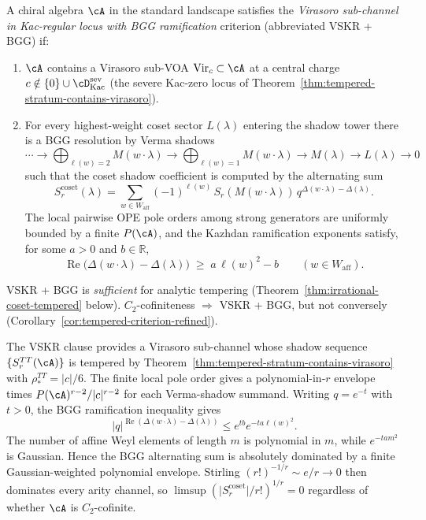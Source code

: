 \begin{definition}
\label{def:vskr-bgg-criterion}
A chiral algebra $\cA$ in the standard landscape satisfies the
\emph{Virasoro sub-channel in Kac-regular locus with BGG
ramification} criterion (abbreviated
VSKR + BGG) if:
\begin{enumerate}[nosep]
\item[(VSKR)] $\cA$ contains a Virasoro sub-VOA
 $\mathrm{Vir}_c \subset \cA$ at a central charge
 $c \notin \{0\} \cup \cD^{\mathrm{sev}}_{\mathrm{Kac}}$ (the
 severe Kac-zero locus of
 Theorem~\ref{thm:tempered-stratum-contains-virasoro}).
\item[(BGG)] For every highest-weight coset sector $L(\lambda)$
 entering the shadow tower there is a BGG resolution by Verma shadows
\[
 \cdots \longrightarrow
 \bigoplus_{\ell(w)=2} M(w\!\cdot\!\lambda)
 \longrightarrow
 \bigoplus_{\ell(w)=1} M(w\!\cdot\!\lambda)
 \longrightarrow
 M(\lambda)
 \longrightarrow
 L(\lambda)
 \longrightarrow 0
\]
 such that the coset shadow coefficient is computed by the
 alternating sum
\[
 S_r^{\mathrm{coset}}(\lambda)
 =
 \sum_{w\in W_{\mathrm{aff}}}
 (-1)^{\ell(w)}\,
 S_r(M(w\!\cdot\!\lambda))\,
 q^{\Delta(w\!\cdot\!\lambda)-\Delta(\lambda)}.
\]
 The local pairwise OPE pole orders among strong generators are
 uniformly bounded by a finite $P(\cA)$, and the Kazhdan ramification
 exponents satisfy, for some $a>0$ and $b\in\mathbb R$,
\[
 \operatorname{Re}\bigl(\Delta(w\!\cdot\!\lambda)-\Delta(\lambda)\bigr)
 \;\ge\;
 a\,\ell(w)^2-b
 \qquad (w\in W_{\mathrm{aff}}).
\]
\end{enumerate}
VSKR + BGG is \emph{sufficient} for analytic tempering
(Theorem~\ref{thm:irrational-coset-tempered} below).
$C_2$-cofiniteness $\Longrightarrow$ VSKR + BGG, but not conversely
(Corollary~\ref{cor:tempered-criterion-refined}).
\end{definition}

\begin{remark}
\label{rem:vskr-bgg-mechanism}
The VSKR clause provides a Virasoro sub-channel whose shadow sequence
$\{S_r^{TT}(\cA)\}$ is tempered by
Theorem~\ref{thm:tempered-stratum-contains-virasoro} with
$\rho_*^{TT} = \lvert c \rvert / 6$. The finite local pole order
gives a polynomial-in-$r$ envelope times
$P(\cA)^{r-2}/\lvert c\rvert^{r-2}$ for each Verma-shadow summand.
Writing $q=e^{-t}$ with $t>0$, the BGG ramification inequality gives
\[
 |q|^{\operatorname{Re}(\Delta(w\cdot\lambda)-\Delta(\lambda))}
 \le
 e^{tb} e^{-ta\ell(w)^2}.
\]
The number of affine Weyl elements of length $m$ is polynomial in
$m$, while $e^{-ta m^2}$ is Gaussian. Hence the BGG alternating sum is
absolutely dominated by a finite Gaussian-weighted polynomial envelope.
Stirling $(r!)^{-1/r} \sim e/r \to 0$ then dominates every arity
channel, so
$\limsup (\lvert S_r^{\mathrm{coset}} \rvert / r!)^{1/r}=0$
regardless of whether $\cA$ is $C_2$-cofinite.
\end{remark}

